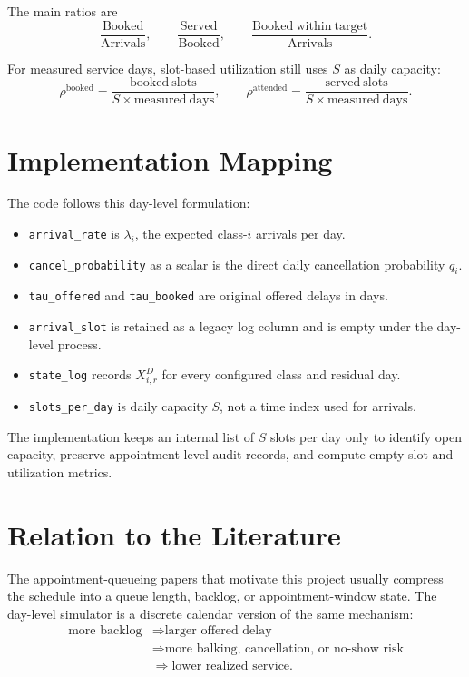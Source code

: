 \documentclass[11pt]{article}
\begin{document}
The main ratios are
\[
\frac{\mathrm{Booked}}{\mathrm{Arrivals}},
\qquad
\frac{\mathrm{Served}}{\mathrm{Booked}},
\qquad
\frac{\mathrm{Booked\ within\ target}}{\mathrm{Arrivals}}.
\]

For measured service days, slot-based utilization still uses \(S\) as daily capacity:
\[
\rho^{\mathrm{booked}}
=
\frac{\mathrm{booked\ slots}}{S\times \mathrm{measured\ days}},
\qquad
\rho^{\mathrm{attended}}
=
\frac{\mathrm{served\ slots}}{S\times \mathrm{measured\ days}}.
\]

\section{Implementation Mapping}

The code follows this day-level formulation:
\begin{itemize}[nosep]
    \item \texttt{arrival\_rate} is \(\lambda_i\), the expected class-\(i\) arrivals per day.
    \item \texttt{cancel\_probability} as a scalar is the direct daily cancellation probability \(q_i\).
    \item \texttt{tau\_offered} and \texttt{tau\_booked} are original offered delays in days.
    \item \texttt{arrival\_slot} is retained as a legacy log column and is empty under the day-level process.
    \item \texttt{state\_log} records \(X_{i,r}^{D}\) for every configured class and residual day.
    \item \texttt{slots\_per\_day} is daily capacity \(S\), not a time index used for arrivals.
\end{itemize}

The implementation keeps an internal list of \(S\) slots per day only to identify open capacity,
preserve appointment-level audit records, and compute empty-slot and utilization metrics.

\section{Relation to the Literature}

The appointment-queueing papers that motivate this project usually compress the schedule into a
queue length, backlog, or appointment-window state. The day-level simulator is a discrete
calendar version of the same mechanism:
\begin{align*}
\text{more backlog}
&\Rightarrow
\text{larger offered delay}\\
&\Rightarrow
\text{more balking, cancellation, or no-show risk}\\
&\Rightarrow
\text{lower realized service}.
\end{align*}
\end{document}

